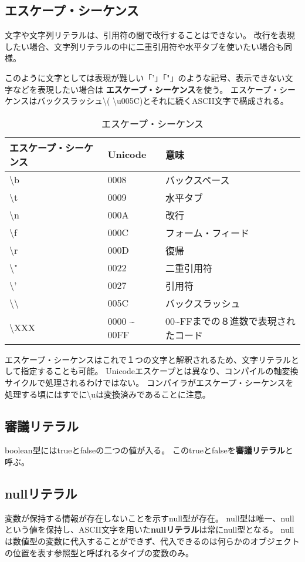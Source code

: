 \documentclass[12pt,a4j,twoside]{jsbook}
\begin{document}
\subsection{エスケープ・シーケンス}
文字や文字列リテラルは、引用符の間で改行することはできない。
改行を表現したい場合、文字列リテラルの中に二重引用符や水平タブを使いたい場合も同様。

このように文字としては表現が難しい「'」「"」のような記号、表示できない文字などを表現したい場合は
\textbf{エスケープ・シーケンス}を使う。
エスケープ・シーケンスはバックスラッシュ\textbackslash ( \textbackslash u005C)とそれに続くASCII文字で構成される。
\begin{table}
    \caption{エスケープ・シーケンス}
    \begin{tabular}{|l|l|l|} \hline
        エスケープ・シーケンス　& Unicode & 意味 \\ \hline
        \textbackslash b & 0008 & バックスペース \\ \hline
        \textbackslash t & 0009 & 水平タブ \\ \hline
        \textbackslash n & 000A & 改行 \\ \hline

        \textbackslash f & 000C & フォーム・フィード \\ \hline
        \textbackslash r & 000D & 復帰 \\ \hline
        \textbackslash " & 0022 & 二重引用符 \\ \hline
        \textbackslash ' & 0027 & 引用符 \\ \hline
        \textbackslash \textbackslash & 005C & バックスラッシュ \\ \hline
        \textbackslash XXX & 0000 \~{} 00FF & 00\~{}FFまでの８進数で表現されたコード \\ \hline
    \end{tabular}
\end{table}
エスケープ・シーケンスはこれで１つの文字と解釈されるため、文字リテラルとして指定することも可能。
Unicodeエスケープとは異なり、コンパイルの軸変換サイクルで処理されるわけではない。
コンパイラがエスケープ・シーケンスを処理する頃にはすでに\textbackslash uは変換済みであることに注意。
\subsection{審議リテラル}
boolean型にはtrueとfalseの二つの値が入る。
このtrueとfalseを\textbf{審議リテラル}と呼ぶ。

\subsection{nullリテラル}
変数が保持する情報が存在しないことを示すnull型が存在。
null型は唯一、nullという値を保持し、ASCII文字を用いた\textbf{nullリテラル}は常にnull型となる。
nullは数値型の変数に代入することができず、代入できるのは何らかのオブジェクトの位置を表す参照型と呼ばれるタイプの変数のみ。
\end{document}

